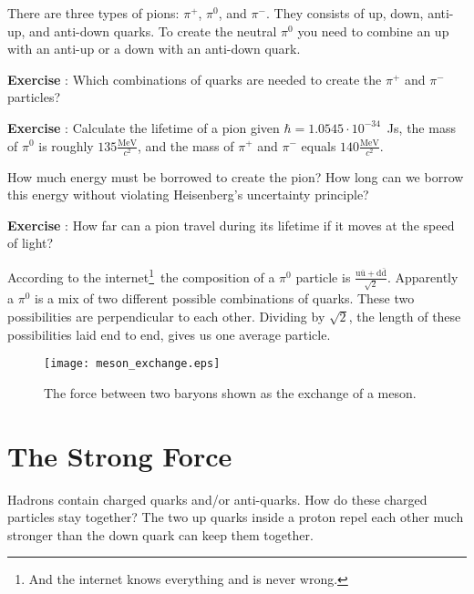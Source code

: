 There are three types of pions: $\pi^+$, $\pi^0$, and $\pi^-$. They consists of up, down, anti-up, and anti-down quarks. To create the neutral $\pi^0$ you need to combine an up with an anti-up or a down with an anti-down quark.

\begin{shaded}
\textbf{Exercise \theExercise {}} : Which combinations of quarks are needed to create the $\pi^+$ and $\pi^-$ particles?\footnotemark\end{shaded}
\begin{shaded}
\textbf{Exercise \theExercise {}} : Calculate the lifetime of a pion given $\hbar=1.0545 \cdot 10^{-34}$~Js, the mass of $\pi^0$ is roughly $135 \frac{\mbox{MeV}}{c^2}$, and the mass of $\pi^+$ and  $\pi^-$ equals $140 \frac{\mbox{MeV}}{c^2}$.

How much energy must be borrowed to create the pion? How long can we borrow this energy without violating Heisenberg's uncertainty principle?\end{shaded}
\begin{shaded}
\textbf{Exercise \theExercise {}} : How far can a pion travel during its lifetime if it moves at the speed of light?\end{shaded}

According to the internet\footnote{And the internet knows everything and is never wrong.}~the composition of a $\pi^0$ particle is $\frac{\mbox{u}\bar{\mbox{u}}+\mbox{d}\bar{\mbox{d}}}{\sqrt{2}}$. Apparently a $\pi^0$ is a mix of two different possible combinations of quarks. These two possibilities are perpendicular to each other. Dividing by $\sqrt{2}$, the length of these possibilities laid end to end, gives us one average particle.

\begin{figure}\begin{center}
\texttt{[image: meson\_exchange.eps]}%
\caption{The force between two baryons shown as the exchange of a meson.}\label{fig:meson_exchange}
\end{center}\end{figure}

\section{The Strong Force}
Hadrons contain charged quarks and/or anti-quarks. How do these charged particles stay together? The two up quarks inside a proton repel each other much stronger than the down quark can keep them together.

